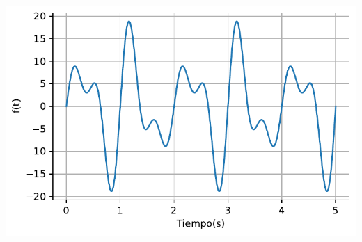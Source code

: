 \documentclass[12pt,a4paper]{article}
\begin{document}
\begin{center}
\includegraphics{Examen0001_files/figure-pdf/tercer-seccion-output-1.pdf}
\end{center}
\end{document}
